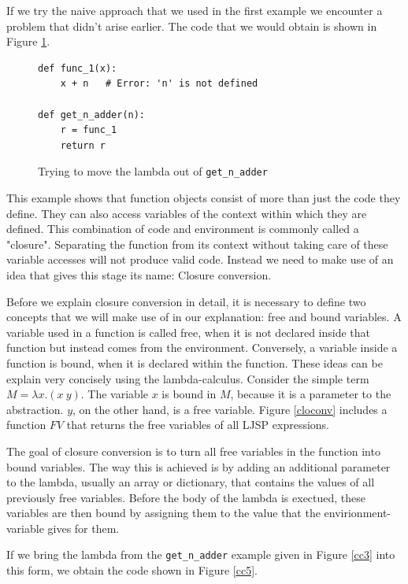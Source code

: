 \documentclass[11pt]{report}
\begin{document}
If we try the naive approach that we used in the first example we encounter a problem that didn't arise earlier. The code that we would obtain is shown in Figure \ref{cc4}.

\begin{figure}[ht]
\begin{lstlisting}
def func_1(x):
    x + n   # Error: 'n' is not defined
    
def get_n_adder(n):
    r = func_1
    return r
\end{lstlisting}
\caption{Trying to move the lambda out of \texttt{get_n_adder}}
\label{cc4}
\end{figure}

This example shows that function objects consist of more than just the code they define. They can also access variables of the context within which they are defined. This combination of code and environment is commonly called a "closure". Separating the function from its context without taking care of these variable accesses will not produce valid code. Instead we need to make use of an idea that gives this stage its name: Closure conversion.

Before we explain closure conversion in detail, it is necessary to define two concepts that we will make use of in our explanation: free and bound variables. A variable used in a function is called free, when it is not declared inside that function but instead comes from the environment. Conversely, a variable inside a function is bound, when it is declared within the function. These ideas can be explain very concisely using the lambda-calculus. Consider the simple term $M = \lambda x.(x\ y)$. The variable $x$ is bound in $M$, because it is a parameter to the abstraction. $y$, on the other hand, is a free variable. Figure \ref{cloconv} includes a function $FV$ that returns the free variables of all LJSP expressions.

The goal of closure conversion is to turn all free variables in the function into bound variables. The way this is achieved is by adding an additional parameter to the lambda, usually an array or dictionary, that contains the values of all previously free variables. Before the body of the lambda is exectued, these variables are then bound by assigning them to the value that the envirionment-variable gives for them. 

If we bring the lambda from the \texttt{get_n_adder} example given in Figure \ref{cc3} into this form, we obtain the code shown in Figure \ref{cc5}.
\end{document}
